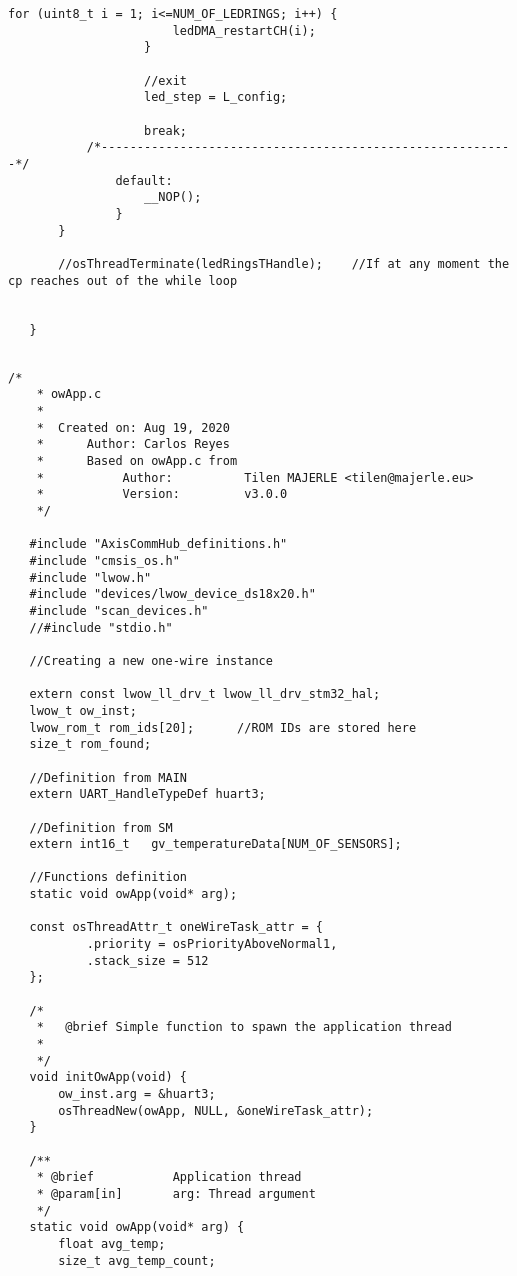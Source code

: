 \begin{lstlisting}[label=lst:led,caption={Main source code for LED DSM.}]
                   for (uint8_t i = 1; i<=NUM_OF_LEDRINGS; i++) {
                       ledDMA_restartCH(i);
                   }
   
                   //exit
                   led_step = L_config;
   
                   break;
           /*----------------------------------------------------------*/
               default:
                   __NOP();
               }
       }
   
       //osThreadTerminate(ledRingsTHandle);	//If at any moment the cp reaches out of the while loop
   
   
   }
   
\end{lstlisting}

\begin{lstlisting}[label=lst:tempApp,caption={Main code for Temperature App.}]
    /*
    * owApp.c
    *
    *  Created on: Aug 19, 2020
    *      Author: Carlos Reyes
    *      Based on owApp.c from
    * 			Author:          Tilen MAJERLE <tilen@majerle.eu>
    * 			Version:         v3.0.0
    */
   
   #include "AxisCommHub_definitions.h"
   #include "cmsis_os.h"
   #include "lwow.h"
   #include "devices/lwow_device_ds18x20.h"
   #include "scan_devices.h"
   //#include "stdio.h"
   
   //Creating a new one-wire instance
   
   extern const lwow_ll_drv_t lwow_ll_drv_stm32_hal;
   lwow_t ow_inst;
   lwow_rom_t rom_ids[20];		//ROM IDs are stored here
   size_t rom_found;
   
   //Definition from MAIN
   extern UART_HandleTypeDef huart3;
   
   //Definition from SM
   extern int16_t	gv_temperatureData[NUM_OF_SENSORS];
   
   //Functions definition
   static void owApp(void* arg);
   
   const osThreadAttr_t oneWireTask_attr = {
           .priority = osPriorityAboveNormal1,
           .stack_size = 512
   };
   
   /*
    * 	@brief Simple function to spawn the application thread
    *
    */
   void initOwApp(void) {
       ow_inst.arg = &huart3;
       osThreadNew(owApp, NULL, &oneWireTask_attr);
   }
   
   /**
    * @brief           Application thread
    * @param[in]       arg: Thread argument
    */
   static void owApp(void* arg) {
       float avg_temp;
       size_t avg_temp_count;
   

\end{lstlisting}
